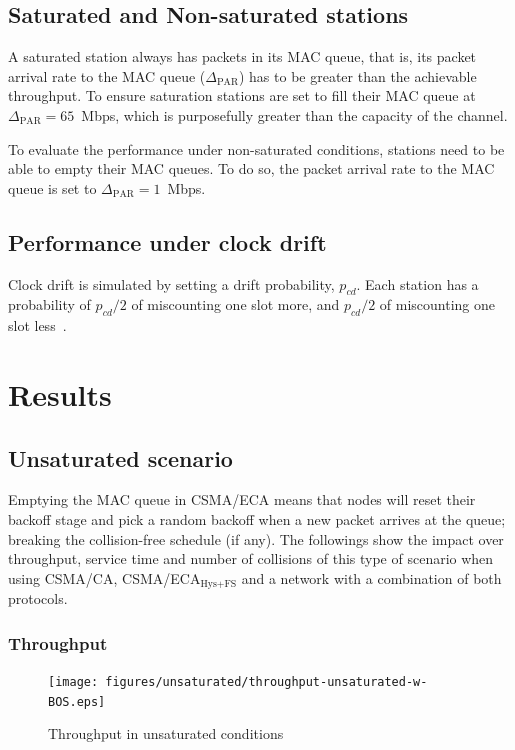 \documentclass[a4paper,journal]{IEEEtran}
\begin{document}
	\subsection{Saturated and Non-saturated stations}\label{unsaturation}
	A saturated station always has packets in its MAC queue, that is, its packet arrival rate to the MAC queue ($\Delta_{\text{PAR}}$) has to be greater than the achievable throughput. To ensure saturation stations are set to fill their MAC queue at $\Delta_{\text{PAR}}=65$~Mbps, which is purposefully greater than the capacity of the channel.
	
	To evaluate the performance under non-saturated conditions, stations need to be able to empty their MAC queues. To do so, the packet arrival rate to the MAC queue is set to $\Delta_{\text{PAR}}=1$~Mbps.
	
	\subsection{Performance under clock drift}
	Clock drift is simulated by setting a drift probability, $p_{cd}$. Each station has a probability of $p_{cd}/2$ of miscounting one slot more, and $p_{cd}/2$ of miscounting one slot less~\cite{slotDrift}.
	

\section{Results}\label{results}

	\subsection{Unsaturated scenario}\label{resultsUnsaturated}
	Emptying the MAC queue in CSMA/ECA means that nodes will reset their backoff stage and pick a random backoff when a new packet arrives at the queue; breaking the collision-free schedule (if any). The followings show the impact over throughput, service time and number of collisions of this type of scenario when using CSMA/CA, CSMA/ECA$_{\text{Hys+FS}}$ and a network with a combination of both protocols.\\
	
	\subsubsection{Throughput}
   	\begin{figure}[htbp]
		\centering
		\texttt{[image: figures/unsaturated/throughput-unsaturated-w-BOS.eps]}
		\caption{Throughput in unsaturated conditions}
		\label{fig:throughputUnsat}
	\end{figure}
\end{document}
